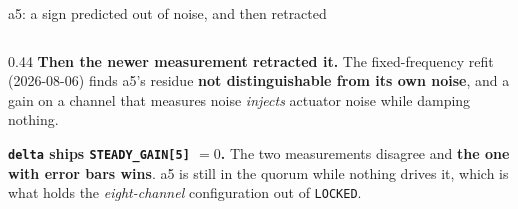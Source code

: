 \documentclass[aspectratio=169]{beamer}
\begin{document}
\begin{frame}{a5: a sign predicted out of noise, and then retracted}
\begin{columns}[T]
\begin{column}{0.44\textwidth}
      \vspace{1.5mm}
      \textbf{Then the newer measurement retracted it.} The
      fixed-frequency refit (2026-08-06) finds a5's residue \textbf{not
      distinguishable from its own noise}, and a gain on a channel that measures
      noise \emph{injects} actuator noise while damping nothing.

      \vspace{1.5mm}
      \textbf{\texttt{delta} ships \texttt{STEADY\_GAIN[5]} $= 0$.} The two measurements
      disagree and \textbf{the one with error bars wins}. a5 is still in the
      quorum while nothing drives it, which is what holds the \emph{eight-channel}
      configuration out of \texttt{LOCKED}.
    \end{column}
  \end{columns}
\end{frame}
\end{document}
